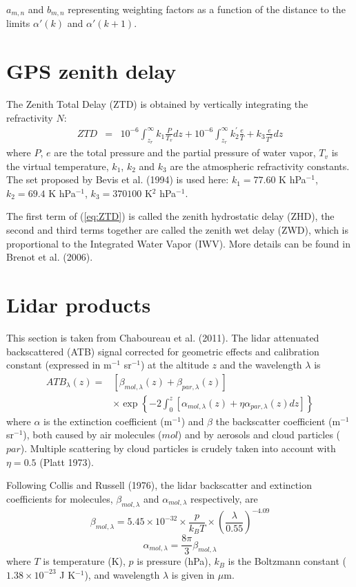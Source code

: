 $a_{m,n}$ and $b_{m,n}$ representing weighting factors as a function of the distance to the limits $\alpha'(k)$ and $\alpha'(k+1)$.
%
\section{GPS zenith delay}
%
The Zenith Total Delay (ZTD) is obtained by vertically integrating the refractivity $N$:
\begin{eqnarray}
 ZTD&=&10^{-6}\int^{\infty}_{z_r} k_{1}\frac{P}{T_v}dz+10^{-6}\int^{\infty}_{z_r}k_2^{'}\frac{e}{T}+k_3\frac{e}{T^2}dz \label{eq:ZTD} 
\end{eqnarray}
where $P$, $e$ are the total pressure and the partial pressure of water vapor, $T_v$ is the virtual temperature, $k_1$, $k_2$ and $k_3$ are the atmospheric refractivity constants. The set proposed by Bevis et al. (1994) is used here: $k_1 =77.60$ K hPa$^{-1}$, $k_2=69.4 $ K hPa$^{-1}$, $k_3=370100$ K$^{2}$ hPa$^{-1}$.

The first term of (\ref{eq:ZTD}) is called the zenith hydrostatic delay (ZHD), the second and third terms together are called the zenith wet delay (ZWD), which is proportional to the Integrated Water Vapor (IWV). More details can be found in Brenot et al. (2006).
%
\section{Lidar products}
%
This section is taken from Chaboureau et al. (2011). The lidar attenuated backscattered (ATB) signal corrected for geometric effects and calibration constant (expressed in m$^{-1}$ sr$^{-1}$) at the altitude $z$ and the wavelength $\lambda$ is
\begin{eqnarray}
ATB_{\lambda}(z) = 
 & \left[ \beta_{mol,\lambda}(z) + \beta_{par,\lambda}(z) \right] \\
 & \times \exp \left\{ -2 \int_0^z 
   \left[\alpha_{mol,\lambda}(z) + \eta \alpha_{par,\lambda}(z) dz
   \right] \right\}  \nonumber
\end{eqnarray} where $\alpha$ is the extinction coefficient (m$^{-1}$) and $\beta$ the backscatter coefficient (m$^{-1}$ sr$^{-1}$), both caused by air molecules (${mol}$) and by aerosols and cloud particles (${par}$). Multiple scattering by cloud particles is crudely taken into account with $\eta=0.5$ (Platt 1973).

Following Collis and Russell (1976), the lidar backscatter and extinction coefficients for molecules, $\beta_{mol,\lambda}$ and $\alpha_{mol,\lambda}$ respectively, are 
\begin{equation}
\beta_{mol,\lambda}=5.45 \times 10^{-32} \times \frac{p}{k_B T} 
\times \left( \frac{\lambda}{0.55} \right)^{-4.09}
\end{equation}
\begin{equation}
\alpha_{mol,\lambda}= \frac{8 \pi}{3} \beta_{mol,\lambda}
\end{equation}
where $T$ is temperature (K), $p$ is pressure (hPa),  $k_B$ is the Boltzmann constant ($1.38 \times 10^{-23}$ J K$^{-1}$), and wavelength $\lambda$ is given in $\mu$m.

